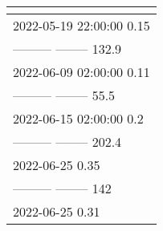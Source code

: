 \begin{table}[!tbp]
\begin{center}
\begin{tabular}{l}
\hline\hline
\multicolumn{1}{c}{}\tabularnewline
\hline
2022-05-19 22:00:00 0.15\tabularnewline
--------- -------- 132.9\tabularnewline
2022-06-09 02:00:00 0.11\tabularnewline
--------- -------- 55.5\tabularnewline
2022-06-15 02:00:00 0.2\tabularnewline
--------- -------- 202.4\tabularnewline
2022-06-25 0.35\tabularnewline
--------- -------- 142\tabularnewline
2022-06-25 0.31\tabularnewline
\hline
\end{tabular}\end{center}
\end{table}

